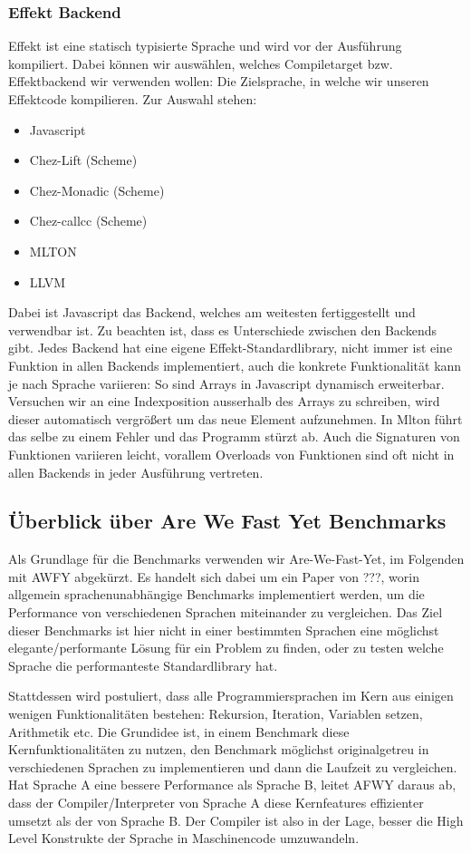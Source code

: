\subsubsection{ Effekt Backend }
Effekt ist eine statisch typisierte Sprache und wird vor der Ausführung kompiliert.
Dabei können wir auswählen, welches Compiletarget bzw. Effektbackend wir verwenden wollen: Die Zielsprache, in welche wir unseren Effektcode kompilieren.
Zur Auswahl stehen:
\begin{itemize}
    \item Javascript
    \item Chez-Lift (Scheme)
    \item Chez-Monadic (Scheme)
    \item Chez-callcc (Scheme)
    \item MLTON
    \item LLVM
\end{itemize}
Dabei ist Javascript das Backend, welches am weitesten fertiggestellt und verwendbar ist. 
Zu beachten ist, dass es Unterschiede zwischen den Backends gibt.
Jedes Backend hat eine eigene Effekt-Standardlibrary, nicht immer ist eine Funktion in allen Backends implementiert, auch die konkrete Funktionalität kann je nach Sprache variieren:
So sind Arrays in Javascript dynamisch erweiterbar. Versuchen wir an eine Indexposition ausserhalb des Arrays zu schreiben, wird dieser automatisch vergrößert um das neue Element aufzunehmen.
In Mlton führt das selbe zu einem Fehler und das Programm stürzt ab.
Auch die Signaturen von Funktionen variieren leicht, vorallem Overloads von Funktionen sind oft nicht in allen Backends in jeder Ausführung vertreten.

\subsection{ Überblick über Are We Fast Yet Benchmarks }
Als Grundlage für die Benchmarks verwenden wir Are-We-Fast-Yet, im Folgenden mit AWFY abgekürzt.
Es handelt sich dabei um ein Paper von ???, worin allgemein sprachenunabhängige Benchmarks implementiert werden, um die Performance von verschiedenen Sprachen miteinander zu vergleichen.
Das Ziel dieser Benchmarks ist hier nicht in einer bestimmten Sprachen eine möglichst elegante/performante Lösung für ein Problem zu finden, oder zu testen welche Sprache die performanteste Standardlibrary hat.

Stattdessen wird postuliert, dass alle Programmiersprachen im Kern aus einigen wenigen Funktionalitäten bestehen: Rekursion, Iteration, Variablen setzen, Arithmetik etc. %
Die Grundidee ist, in einem Benchmark diese Kernfunktionalitäten zu nutzen, den Benchmark möglichst originalgetreu in verschiedenen Sprachen zu implementieren und dann die Laufzeit zu vergleichen. Hat Sprache A eine bessere Performance als Sprache B, leitet AFWY daraus ab, dass der Compiler/Interpreter von Sprache A diese Kernfeatures effizienter umsetzt als der von Sprache B.
Der Compiler ist also in der Lage, besser die High Level Konstrukte der Sprache in Maschinencode umzuwandeln.

